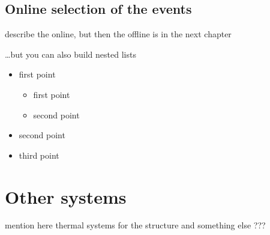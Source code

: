 \subsection[Online selection of the events]{Online selection of the events}

describe the online, but then the offline is in the next chapter

\noindent
\dots but you can also build nested lists
\begin{itemize}
\item first point
	\begin{itemize} %
	\item first point
	\item second point
	\end{itemize}
\item second point
\item third point \\
\end{itemize}




\section[Other systems]{Other systems}

mention here thermal systems for the structure and something else ???

